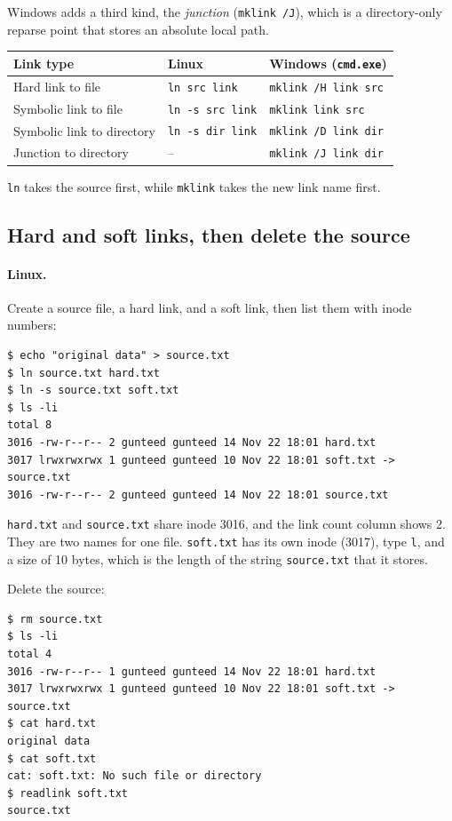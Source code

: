\documentclass[11pt,a4paper]{article}
\newcommand{\code}[1]{\texttt{#1}}
\begin{document}
Windows adds a third kind, the \emph{junction} (\code{mklink /J}), which is a
directory-only reparse point that stores an absolute local path.

\begin{center}
\begin{tabular}{@{}lll@{}}
\toprule
Link type & Linux & Windows (\code{cmd.exe}) \\
\midrule
Hard link to file & \code{ln src link} & \code{mklink /H link src} \\
Symbolic link to file & \code{ln -s src link} & \code{mklink link src} \\
Symbolic link to directory & \code{ln -s dir link} & \code{mklink /D link dir} \\
Junction to directory & -- & \code{mklink /J link dir} \\
\bottomrule
\end{tabular}
\end{center}

\code{ln} takes the source first, while \code{mklink} takes the new link name
first.

\subsection{Hard and soft links, then delete the source}

\paragraph{Linux.} Create a source file, a hard link, and a soft link, then list
them with inode numbers:

\begin{lstlisting}
$ echo "original data" > source.txt
$ ln source.txt hard.txt
$ ln -s source.txt soft.txt
$ ls -li
total 8
3016 -rw-r--r-- 2 gunteed gunteed 14 Nov 22 18:01 hard.txt
3017 lrwxrwxrwx 1 gunteed gunteed 10 Nov 22 18:01 soft.txt -> source.txt
3016 -rw-r--r-- 2 gunteed gunteed 14 Nov 22 18:01 source.txt
\end{lstlisting}

\code{hard.txt} and \code{source.txt} share inode 3016, and the link count
column shows 2. They are two names for one file. \code{soft.txt} has its own
inode (3017), type \code{l}, and a size of 10 bytes, which is the length of the
string \code{source.txt} that it stores.

Delete the source:

\begin{lstlisting}
$ rm source.txt
$ ls -li
total 4
3016 -rw-r--r-- 1 gunteed gunteed 14 Nov 22 18:01 hard.txt
3017 lrwxrwxrwx 1 gunteed gunteed 10 Nov 22 18:01 soft.txt -> source.txt
$ cat hard.txt
original data
$ cat soft.txt
cat: soft.txt: No such file or directory
$ readlink soft.txt
source.txt
\end{lstlisting}
\end{document}
